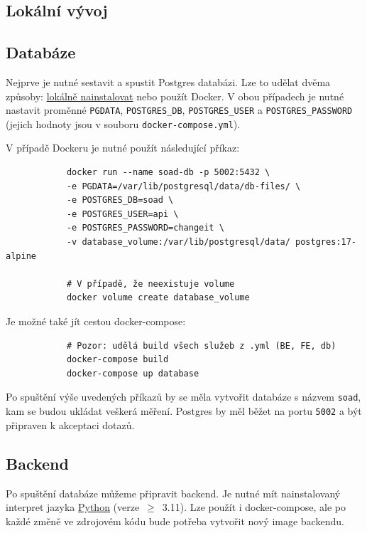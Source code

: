 \documentclass[12pt]{article}
\begin{document}
\begin{teamwork}
        \section{Lokální vývoj}\label{sec:lokalni_vyvoj}

        \subsection{Databáze}\label{subsec:databaze}

        Nejprve je nutné sestavit a spustit Postgres databázi.
        Lze to udělat dvěma způsoby: \href{https://www.postgresql.org/download/}{lokálně nainstalovat} nebo použít Docker.
        V obou případech je nutné nastavit proměnné \texttt{PGDATA}, \texttt{POSTGRES\_DB}, \texttt{POSTGRES\_USER} a \texttt{POSTGRES\_PASSWORD} (jejich hodnoty jsou v souboru \texttt{docker-compose.yml}).

        V případě Dockeru je nutné použít následující příkaz:

        \begin{verbatim}
            docker run --name soad-db -p 5002:5432 \
            -e PGDATA=/var/lib/postgresql/data/db-files/ \
            -e POSTGRES_DB=soad \
            -e POSTGRES_USER=api \
            -e POSTGRES_PASSWORD=changeit \
            -v database_volume:/var/lib/postgresql/data/ postgres:17-alpine

            # V případě, že neexistuje volume
            docker volume create database_volume
        \end{verbatim}

        Je možné také jít cestou docker-compose:

        \begin{verbatim}
            # Pozor: udělá build všech služeb z .yml (BE, FE, db)
            docker-compose build
            docker-compose up database
        \end{verbatim}

        Po spuštění výše uvedených příkazů by se měla vytvořit databáze s názvem \texttt{soad}, kam se budou ukládat veškerá měření.
        Postgres by měl běžet na portu \texttt{5002} a být připraven k akceptaci dotazů.

        \subsection{Backend}\label{subsec:backend}

        Po spuštění databáze můžeme připravit backend.
        Je nutné mít nainstalovaný interpret jazyka \href{https://www.python.org/downloads/}{Python} (verze~$\geq$~3.11).
        Lze použít i docker-compose, ale po každé změně ve zdrojovém kódu bude potřeba vytvořit nový image backendu.


\end{teamwork}
\end{document}
